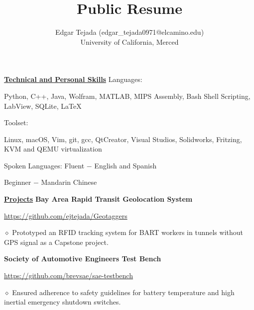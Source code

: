 \documentclass [11pt]{article}
\title{Public Resume}
\author{Edgar Tejada (edgar_tejada0971@elcamino.edu)\\University of California, Merced}
\begin{document}
\begin{flushleft}

\underline{\textbf{Technical and Personal Skills}}
\linebreak
Languages{:}\begin{minipage}{0.87\linewidth}\begin{flushright}Python, C++, ‬Java,‭ ‬Wolfram,‭ ‬MATLAB,‭ MIPS Assembly,‭ ‬Bash Shell Scripting, ‬LabView, ‬SQLite, \LaTeX\end{flushright}\end{minipage}\newline
Toolset{:}‭\begin{minipage}{0.9\linewidth}\begin{center}Linux, ‬macOS, ‬Vim, ‬git, ‬gcc, ‬QtCreator, ‬Visual Studios, Solidworks, Fritzing, KVM and QEMU virtualization\end{center}\end{minipage}\newline
Spoken Languages{:} Fluent $-$ ‬English and ‬Spanish\begin{minipage}{0.57\linewidth}\begin{flushright}Beginner $-$ Mandarin Chinese\end{flushright}\end{minipage}\newline

\underline{\textbf{Projects}}
\linebreak
\textbf{Bay Area Rapid Transit Geolocation System}\begin{minipage}{0.61 \linewidth}\begin{flushright}\href{https://github.com/ejtejada/Geotaggers}{https://github.com/ejtejada/Geotaggers}\end{flushright}\end{minipage}

‭‭\quad\quad\quad$\diamond$ Prototyped an RFID tracking system for BART workers in tunnels without GPS signal as a Capstone project.

\textbf{Society of Automotive Engineers Test Bench}\begin{minipage}{0.61 \linewidth}\begin{flushright}\href{https://github.com/brevsae/sae-testbench}{https://github.com/brevsae/sae-testbench}\end{flushright}\end{minipage}

‭‭\quad\quad\quad$\diamond$ Ensured adherence to safety guidelines for battery temperature and high inertial emergency shutdown switches.


\end{flushleft}
\end{document}
